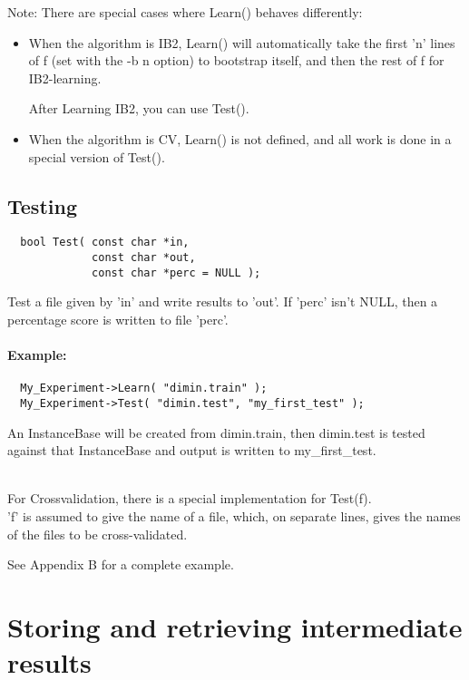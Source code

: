 \documentclass{article}
\begin{document}
Note: There are special cases where Learn() behaves differently:

\begin{itemize}
\item When the algorithm is IB2, Learn() will automatically take the
first 'n' lines of f (set with the -b n option) to bootstrap itself,
and then the rest of f for IB2-learning. 

After Learning IB2, you can use Test().

\item When the algorithm is CV, Learn() is not defined, and all work
is done in a special version of Test().
\end{itemize}

\subsection{Testing}
\begin{verbatim}
  bool Test( const char *in,
             const char *out,
             const char *perc = NULL );
\end{verbatim}

Test a file given by 'in' and write results to 'out'. If 'perc' isn't
NULL, then a percentage score is written to file 'perc'.

\paragraph{Example:}
\begin{verbatim}
  My_Experiment->Learn( "dimin.train" );  
  My_Experiment->Test( "dimin.test", "my_first_test" );  
\end{verbatim}

An InstanceBase will be created from dimin.train, then dimin.test is
tested against that InstanceBase and output is written to
my\_first\_test.

\ \\
For Crossvalidation, there is a special implementation for Test(f).\\
'f' is assumed to give the name of a file, which, on separate lines,
gives the names of the files to be cross-validated. 

See Appendix B for a complete example.

\section{Storing and retrieving intermediate results}
\end{document}
